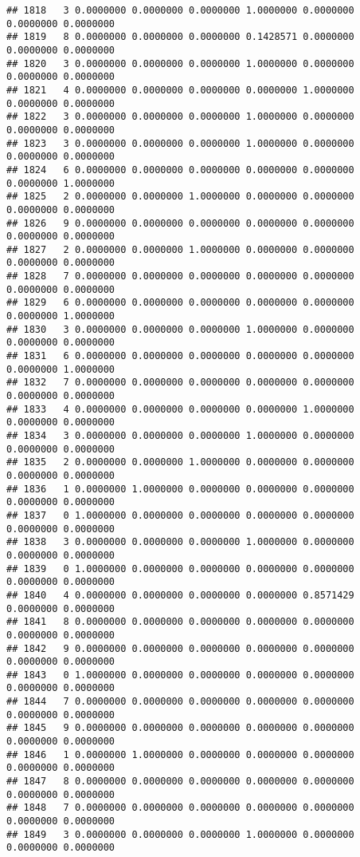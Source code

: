 \documentclass[
]{article}
\begin{document}
\begin{verbatim}
## 1818   3 0.0000000 0.0000000 0.0000000 1.0000000 0.0000000 0.0000000 0.0000000
## 1819   8 0.0000000 0.0000000 0.0000000 0.1428571 0.0000000 0.0000000 0.0000000
## 1820   3 0.0000000 0.0000000 0.0000000 1.0000000 0.0000000 0.0000000 0.0000000
## 1821   4 0.0000000 0.0000000 0.0000000 0.0000000 1.0000000 0.0000000 0.0000000
## 1822   3 0.0000000 0.0000000 0.0000000 1.0000000 0.0000000 0.0000000 0.0000000
## 1823   3 0.0000000 0.0000000 0.0000000 1.0000000 0.0000000 0.0000000 0.0000000
## 1824   6 0.0000000 0.0000000 0.0000000 0.0000000 0.0000000 0.0000000 1.0000000
## 1825   2 0.0000000 0.0000000 1.0000000 0.0000000 0.0000000 0.0000000 0.0000000
## 1826   9 0.0000000 0.0000000 0.0000000 0.0000000 0.0000000 0.0000000 0.0000000
## 1827   2 0.0000000 0.0000000 1.0000000 0.0000000 0.0000000 0.0000000 0.0000000
## 1828   7 0.0000000 0.0000000 0.0000000 0.0000000 0.0000000 0.0000000 0.0000000
## 1829   6 0.0000000 0.0000000 0.0000000 0.0000000 0.0000000 0.0000000 1.0000000
## 1830   3 0.0000000 0.0000000 0.0000000 1.0000000 0.0000000 0.0000000 0.0000000
## 1831   6 0.0000000 0.0000000 0.0000000 0.0000000 0.0000000 0.0000000 1.0000000
## 1832   7 0.0000000 0.0000000 0.0000000 0.0000000 0.0000000 0.0000000 0.0000000
## 1833   4 0.0000000 0.0000000 0.0000000 0.0000000 1.0000000 0.0000000 0.0000000
## 1834   3 0.0000000 0.0000000 0.0000000 1.0000000 0.0000000 0.0000000 0.0000000
## 1835   2 0.0000000 0.0000000 1.0000000 0.0000000 0.0000000 0.0000000 0.0000000
## 1836   1 0.0000000 1.0000000 0.0000000 0.0000000 0.0000000 0.0000000 0.0000000
## 1837   0 1.0000000 0.0000000 0.0000000 0.0000000 0.0000000 0.0000000 0.0000000
## 1838   3 0.0000000 0.0000000 0.0000000 1.0000000 0.0000000 0.0000000 0.0000000
## 1839   0 1.0000000 0.0000000 0.0000000 0.0000000 0.0000000 0.0000000 0.0000000
## 1840   4 0.0000000 0.0000000 0.0000000 0.0000000 0.8571429 0.0000000 0.0000000
## 1841   8 0.0000000 0.0000000 0.0000000 0.0000000 0.0000000 0.0000000 0.0000000
## 1842   9 0.0000000 0.0000000 0.0000000 0.0000000 0.0000000 0.0000000 0.0000000
## 1843   0 1.0000000 0.0000000 0.0000000 0.0000000 0.0000000 0.0000000 0.0000000
## 1844   7 0.0000000 0.0000000 0.0000000 0.0000000 0.0000000 0.0000000 0.0000000
## 1845   9 0.0000000 0.0000000 0.0000000 0.0000000 0.0000000 0.0000000 0.0000000
## 1846   1 0.0000000 1.0000000 0.0000000 0.0000000 0.0000000 0.0000000 0.0000000
## 1847   8 0.0000000 0.0000000 0.0000000 0.0000000 0.0000000 0.0000000 0.0000000
## 1848   7 0.0000000 0.0000000 0.0000000 0.0000000 0.0000000 0.0000000 0.0000000
## 1849   3 0.0000000 0.0000000 0.0000000 1.0000000 0.0000000 0.0000000 0.0000000

\end{verbatim}
\end{document}
